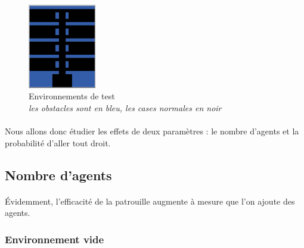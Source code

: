 \documentclass{article}
\begin{document}
\begin{figure}[!h]
\begin{center}
                \includegraphics[width = \textwidth/5, height = 3.7cm]{corridor_png.PNG}
                \caption{Environnements de test \\ \textit{les obstacles sont en bleu, les cases normales en noir}}
            \end{center}
        \end{figure}

        \paragraph{} Nous allons donc étudier les effets de deux paramètres : le nombre d'agents et la probabilité d'aller tout droit.
    \subsection{Nombre d'agents}
        \paragraph{}Évidemment, l'efficacité de la patrouille augmente à mesure que l'on ajoute des agents.
        \subsubsection{Environnement vide}
\end{document}
